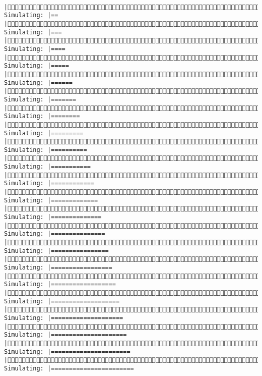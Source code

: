 \documentclass[]{article}
\begin{document}
\begin{verbatim}
     |(3/4) Simulating: |==                                                     |(3/4) Simulating: |===                                                    |(3/4) Simulating: |====                                                   |(3/4) Simulating: |=====                                                  |(3/4) Simulating: |======                                                 |(3/4) Simulating: |=======                                                |(3/4) Simulating: |========                                               |(3/4) Simulating: |=========                                              |(3/4) Simulating: |==========                                             |(3/4) Simulating: |===========                                            |(3/4) Simulating: |============                                           |(3/4) Simulating: |=============                                          |(3/4) Simulating: |==============                                         |(3/4) Simulating: |===============                                        |(3/4) Simulating: |================                                       |(3/4) Simulating: |=================                                      |(3/4) Simulating: |==================                                     |(3/4) Simulating: |===================                                    |(3/4) Simulating: |====================                                   |(3/4) Simulating: |=====================                                  |(3/4) Simulating: |======================                                 |(3/4) Simulating: |=======================                                
\end{verbatim}
\end{document}
